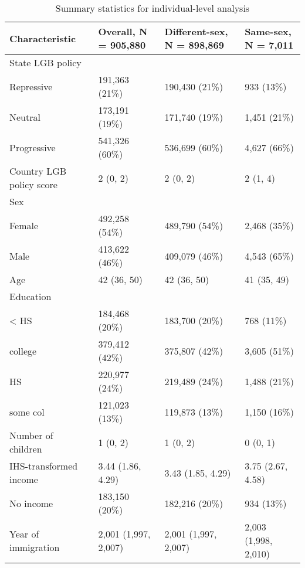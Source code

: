 \documentclass[
  11pt,
]{article}
\begin{document}
\begin{table}[!h]

\caption{\label{tab:desc-table-ind}Summary statistics for individual-level analysis}
\centering
\fontsize{8}{10}\selectfont
\begin{tabular}[t]{llll}
\toprule
Characteristic & Overall, N = 905,880 & Different-sex, N = 898,869 & Same-sex, N = 7,011\\
\midrule
State LGB policy &  &  & \\
\hspace{1em}Repressive & 191,363 (21\%) & 190,430 (21\%) & 933 (13\%)\\
\hspace{1em}Neutral & 173,191 (19\%) & 171,740 (19\%) & 1,451 (21\%)\\
\hspace{1em}Progressive & 541,326 (60\%) & 536,699 (60\%) & 4,627 (66\%)\\
Country LGB policy score & 2 (0, 2) & 2 (0, 2) & 2 (1, 4)\\
\addlinespace
Sex &  &  & \\
\hspace{1em}Female & 492,258 (54\%) & 489,790 (54\%) & 2,468 (35\%)\\
\hspace{1em}Male & 413,622 (46\%) & 409,079 (46\%) & 4,543 (65\%)\\
Age & 42 (36, 50) & 42 (36, 50) & 41 (35, 49)\\
Education &  &  & \\
\addlinespace
\hspace{1em}< HS & 184,468 (20\%) & 183,700 (20\%) & 768 (11\%)\\
\hspace{1em}college & 379,412 (42\%) & 375,807 (42\%) & 3,605 (51\%)\\
\hspace{1em}HS & 220,977 (24\%) & 219,489 (24\%) & 1,488 (21\%)\\
\hspace{1em}some col & 121,023 (13\%) & 119,873 (13\%) & 1,150 (16\%)\\
Number of children & 1 (0, 2) & 1 (0, 2) & 0 (0, 1)\\
\addlinespace
IHS-transformed income & 3.44 (1.86, 4.29) & 3.43 (1.85, 4.29) & 3.75 (2.67, 4.58)\\
No income & 183,150 (20\%) & 182,216 (20\%) & 934 (13\%)\\
Year of immigration & 2,001 (1,997, 2,007) & 2,001 (1,997, 2,007) & 2,003 (1,998, 2,010)\\

\end{tabular}
\end{table}
\end{document}
